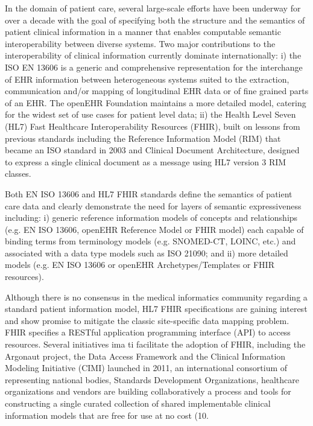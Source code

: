 \documentclass{amia}
\begin{document}
In the domain of patient care, several large-scale efforts have been underway for over a decade with the goal of specifying both the structure and the semantics of patient clinical information in a manner that enables computable semantic interoperability between diverse systems. Two major contributions to the interoperability of clinical information currently dominate internationally: i) the ISO EN 13606 is a generic and comprehensive representation for the interchange of EHR information between heterogeneous systems suited to the extraction, communication and/or mapping of longitudinal EHR data or of fine grained parts of an EHR. The openEHR Foundation maintains a more detailed model, catering for the widest set of use cases for patient level data; ii) the Health Level Seven (HL7) Fast Healthcare Interoperability Resources (FHIR), built on lessons\cite{ref10} from previous standards including the Reference Information Model (RIM) that became an ISO standard in 2003 and Clinical Document Architecture, designed to express a single clinical document as a message using HL7 version 3 RIM classes.

Both EN ISO 13606 and HL7 FHIR standards define the semantics of patient care data and clearly demonstrate the need for layers of semantic expressiveness including: i) generic reference information models of concepts and relationships (e.g. EN ISO 13606, openEHR Reference Model or FHIR model) each capable of binding terms from terminology models (e.g. SNOMED-CT, LOINC, etc.) and associated with a data type models such as ISO 21090; and ii) more detailed models (e.g. EN ISO 13606 or openEHR Archetypes/Templates or FHIR resources). 

Although there is no consensus in the medical informatics community regarding a standard patient information model, HL7 FHIR specifications are gaining interest and show promise to mitigate the classic site-specific data mapping problem. FHIR specifies a RESTful application programming interface (API) to access resources. Several initiatives ima ti facilitate the adoption of FHIR, including the Argonaut project\cite{ref11}, the Data Access Framework\cite{ref12} and the Clinical Information Modeling Initiative (CIMI) launched in 2011, an international consortium of representing national bodies, Standards Development Organizations, healthcare organizations and vendors are building collaboratively a process and tools for constructing a single curated collection of shared implementable clinical information models that are free for use at no cost (10.
\end{document}

